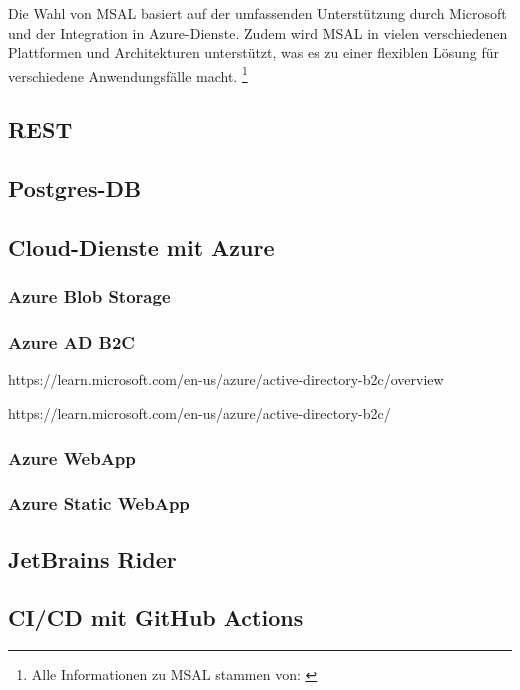 Die Wahl von MSAL basiert auf der umfassenden Unterstützung durch Microsoft und der 
Integration in Azure-Dienste. Zudem wird MSAL in vielen verschiedenen Plattformen und 
Architekturen unterstützt, was es zu einer flexiblen Lösung für verschiedene Anwendungsfälle 
macht.
\footnote{Alle Informationen zu MSAL stammen von: \cite{MicrosoftCorporationmsal}}


\subsection{REST}

\subsection{Postgres-DB}
\label{subsection:postgres_db}

\subsection{Cloud-Dienste mit Azure}

\subsubsection{Azure Blob Storage}
\label{subsection:azure_blob_storage}

\subsubsection{Azure AD B2C}
\label{subsection:azure_ad_b2c}

https://learn.microsoft.com/en-us/azure/active-directory-b2c/overview

https://learn.microsoft.com/en-us/azure/active-directory-b2c/

\subsubsection{Azure WebApp}
\label{subsection:azure_web_app}

\subsubsection{Azure Static WebApp}
\label{subsection:azure_static_web_app}

\subsection{JetBrains Rider}
\label{subsection:jetbrains-rider}

\subsection{CI/CD mit GitHub Actions}
